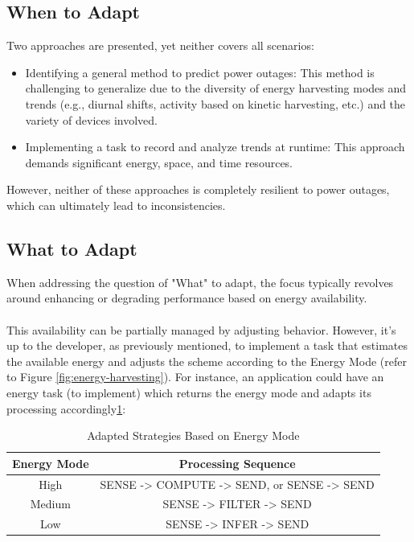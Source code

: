     \newpage
    \subsection{When to Adapt}
        Two approaches are presented, yet neither covers all scenarios\cite{basedArticle}:
        \begin{itemize}
            \item Identifying a general method to predict power outages: This method is challenging to generalize due to the diversity of energy harvesting modes and trends (e.g., diurnal shifts, activity based on kinetic harvesting, etc.) and the variety of devices involved.
            \item Implementing a task to record and analyze trends at runtime: This approach demands significant energy, space, and time resources.
        \end{itemize}
        
        \noindent
        However, neither of these approaches is completely resilient to power outages, which can ultimately lead to inconsistencies.
        

    \subsection{What to Adapt}
        When addressing the question of "What" to adapt, the focus typically revolves around enhancing or degrading performance based on energy availability.
        
        \paragraph{}
        This availability can be partially managed by adjusting behavior. However, it's up to the developer, as previously mentioned, to implement a task that estimates the available energy and adjusts the scheme according to the Energy Mode (refer to Figure \ref{fig:energy-harvesting}). For instance, an application could have an energy task (to implement) which returns the energy mode and adapts its processing accordingly\ref{table:energymode}:
        
        \begin{table}[h]
        \centering
        \begin{tabular}{|c|c|}
        \hline
        \textbf{Energy Mode} & \textbf{Processing Sequence} \\
        \hline
        High & SENSE -> COMPUTE -> SEND, or SENSE -> SEND \\
        Medium & SENSE -> FILTER -> SEND \\
        Low & SENSE -> INFER -> SEND \\
        \hline
        \end{tabular}
        \caption{Adapted Strategies Based on Energy Mode}
        \label{table:energymode}
        \end{table}
        
